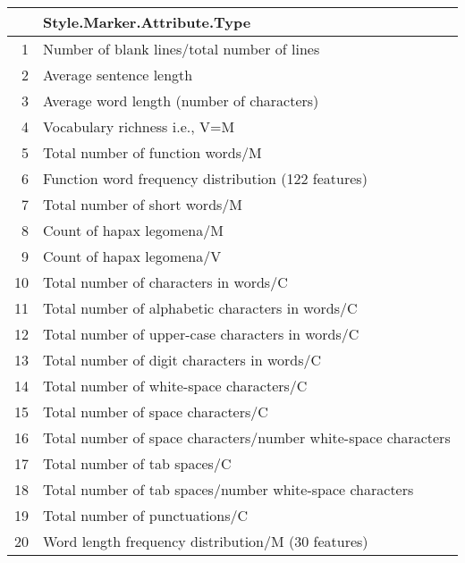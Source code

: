 \begin{table}[ht]
\centering
\begin{tabular}{rl}
  \hline
 & Style.Marker.Attribute.Type \\ 
  \hline
1 & Number of blank lines/total number of lines \\ 
  2 & Average sentence length \\ 
  3 & Average word length (number of characters) \\ 
  4 & Vocabulary richness i.e., V=M \\ 
  5 & Total number of function words/M \\ 
  6 & Function word frequency distribution (122 features) \\ 
  7 & Total number of short words/M \\ 
  8 & Count of hapax legomena/M \\ 
  9 & Count of hapax legomena/V \\ 
  10 & Total number of characters in words/C \\ 
  11 & Total number of alphabetic characters in words/C \\ 
  12 & Total number of upper-case characters in words/C \\ 
  13 & Total number of digit characters in words/C \\ 
  14 & Total number of white-space characters/C \\ 
  15 & Total number of space characters/C \\ 
  16 & Total number of space characters/number white-space characters \\ 
  17 & Total number of tab spaces/C \\ 
  18 & Total number of tab spaces/number white-space characters \\ 
  19 & Total number of punctuations/C \\ 
  20 & Word length frequency distribution/M (30 features) \\ 
   \hline
\end{tabular}
\end{table}
